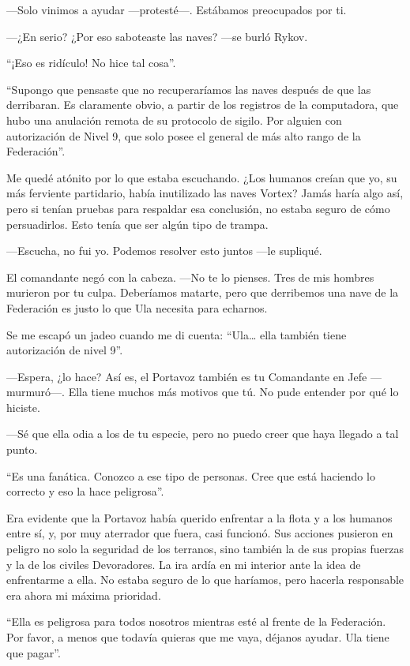 —Solo vinimos a ayudar —protesté—. Estábamos preocupados por ti.

—¿En serio? ¿Por eso saboteaste las naves? —se burló Rykov.

``¡Eso es ridículo! No hice tal cosa''.

``Supongo que pensaste que no recuperaríamos las naves después de que las derribaran. Es claramente obvio, a partir de los registros de la computadora, que hubo una anulación remota de su protocolo de sigilo. Por alguien con autorización de Nivel 9, que solo posee el general de más alto rango de la Federación''.

Me quedé atónito por lo que estaba escuchando. ¿Los humanos creían que yo, su más ferviente partidario, había inutilizado las naves Vortex? Jamás haría algo así, pero si tenían pruebas para respaldar esa conclusión, no estaba seguro de cómo persuadirlos. Esto tenía que ser algún tipo de trampa.

—Escucha, no fui yo. Podemos resolver esto juntos —le supliqué.

El comandante negó con la cabeza. —No te lo pienses. Tres de mis hombres murieron por tu culpa. Deberíamos matarte, pero que derribemos una nave de la Federación es justo lo que Ula necesita para echarnos.

Se me escapó un jadeo cuando me di cuenta: ``Ula… ella también tiene autorización de nivel 9''.

—Espera, ¿lo hace? Así es, el Portavoz también es tu Comandante en Jefe —murmuró—. Ella tiene muchos más motivos que tú. No pude entender por qué lo hiciste.

—Sé que ella odia a los de tu especie, pero no puedo creer que haya llegado a tal punto.

``Es una fanática. Conozco a ese tipo de personas. Cree que está haciendo lo correcto y eso la hace peligrosa''.

Era evidente que la Portavoz había querido enfrentar a la flota y a los humanos entre sí, y, por muy aterrador que fuera, casi funcionó. Sus acciones pusieron en peligro no solo la seguridad de los terranos, sino también la de sus propias fuerzas y la de los civiles Devoradores. La ira ardía en mi interior ante la idea de enfrentarme a ella. No estaba seguro de lo que haríamos, pero hacerla responsable era ahora mi máxima prioridad.

``Ella es peligrosa para todos nosotros mientras esté al frente de la Federación. Por favor, a menos que todavía quieras que me vaya, déjanos ayudar. Ula tiene que pagar''.

